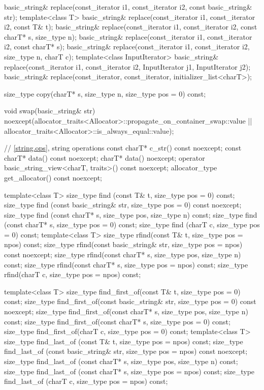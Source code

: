 \begin{codeblock}
{{    basic_string& replace(const_iterator i1, const_iterator i2, const basic_string& str);
    template<class T>
      basic_string& replace(const_iterator i1, const_iterator i2, const T& t);
    basic_string& replace(const_iterator i1, const_iterator i2, const charT* s, size_type n);
    basic_string& replace(const_iterator i1, const_iterator i2, const charT* s);
    basic_string& replace(const_iterator i1, const_iterator i2, size_type n, charT c);
    template<class InputIterator>
      basic_string& replace(const_iterator i1, const_iterator i2,
                            InputIterator j1, InputIterator j2);
    basic_string& replace(const_iterator, const_iterator, initializer_list<charT>);

    size_type copy(charT* s, size_type n, size_type pos = 0) const;

    void swap(basic_string& str)
      noexcept(allocator_traits<Allocator>::propagate_on_container_swap::value ||
               allocator_traits<Allocator>::is_always_equal::value);

    // \ref{string.ops}, string operations
    const charT* c_str() const noexcept;
    const charT* data() const noexcept;
    charT* data() noexcept;
    operator basic_string_view<charT, traits>() const noexcept;
    allocator_type get_allocator() const noexcept;

    template<class T>
      size_type find (const T& t, size_type pos = 0) const;
    size_type find (const basic_string& str, size_type pos = 0) const noexcept;
    size_type find (const charT* s, size_type pos, size_type n) const;
    size_type find (const charT* s, size_type pos = 0) const;
    size_type find (charT c, size_type pos = 0) const;
    template<class T>
      size_type rfind(const T& t, size_type pos = npos) const;
    size_type rfind(const basic_string& str, size_type pos = npos) const noexcept;
    size_type rfind(const charT* s, size_type pos, size_type n) const;
    size_type rfind(const charT* s, size_type pos = npos) const;
    size_type rfind(charT c, size_type pos = npos) const;

    template<class T>
      size_type find_first_of(const T& t, size_type pos = 0) const;
    size_type find_first_of(const basic_string& str, size_type pos = 0) const noexcept;
    size_type find_first_of(const charT* s, size_type pos, size_type n) const;
    size_type find_first_of(const charT* s, size_type pos = 0) const;
    size_type find_first_of(charT c, size_type pos = 0) const;
    template<class T>
      size_type find_last_of (const T& t, size_type pos = npos) const;
    size_type find_last_of (const basic_string& str, size_type pos = npos) const noexcept;
    size_type find_last_of (const charT* s, size_type pos, size_type n) const;
    size_type find_last_of (const charT* s, size_type pos = npos) const;
    size_type find_last_of (charT c, size_type pos = npos) const;

}}
\end{codeblock}
